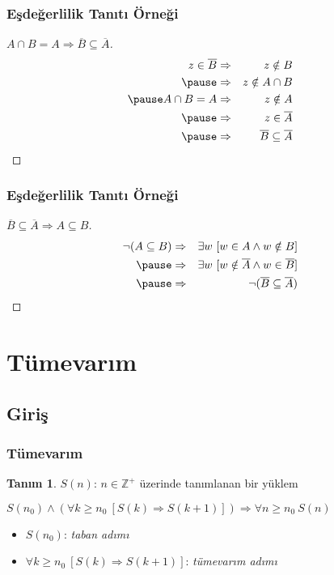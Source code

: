 \documentclass[dvipsnames]{beamer}
\theoremstyle{definition}
\newtheorem{tanim}[theorem]{Tanım}
\theoremstyle{example}
\theoremstyle{plain}
\begin{document}
\begin{frame}
  \frametitle{Eşdeğerlilik Tanıtı Örneği}

  \begin{proof}[$A \cap B = A \Rightarrow \overline{B} \subseteq \overline{A}$]
    \begin{eqnarray*}
      z \in \overline{B} & \Rightarrow & z \notin B\\\pause
                         & \Rightarrow & z \notin A \cap B\\\pause
      A \cap B = A       & \Rightarrow & z \notin A\\\pause
                         & \Rightarrow & z \in \overline{A}\\\pause
                         & \Rightarrow & \overline{B} \subseteq \overline{A}
    \end{eqnarray*}
  \end{proof}
\end{frame}

\begin{frame}
  \frametitle{Eşdeğerlilik Tanıtı Örneği}

  \begin{proof}[$\overline{B} \subseteq \overline{A} \Rightarrow A \subseteq B$]
    \begin{eqnarray*}
      \neg(A \subseteq B)
        & \Rightarrow & \exists w~[w \in A \wedge w \notin B]\\\pause
        & \Rightarrow & \exists w~[w \notin \overline{A} \wedge w \in \overline{B}]\\\pause
        & \Rightarrow & \neg(\overline{B} \subseteq \overline{A})
    \end{eqnarray*}
  \end{proof}
\end{frame}

\section{Tümevarım}

\subsection{Giriş}

\begin{frame}
  \frametitle{Tümevarım}

  \begin{tanim}
    $S(n)$: $n \in \mathbb{Z}^+$ üzerinde tanımlanan bir yüklem

    \pause
    \medskip
    $S(n_0) \wedge (\forall k \geq n_0~[S(k) \Rightarrow S(k+1)])
      \Rightarrow \forall n \geq n_0~S(n)$
  \end{tanim}

  \pause
  \medskip
  \begin{itemize}
    \item $S(n_0)$: \emph{taban adımı}
    \item $\forall k \geq n_0~[S(k) \Rightarrow S(k+1)]$: \emph{tümevarım adımı}
  \end{itemize}
\end{frame}
\end{document}
